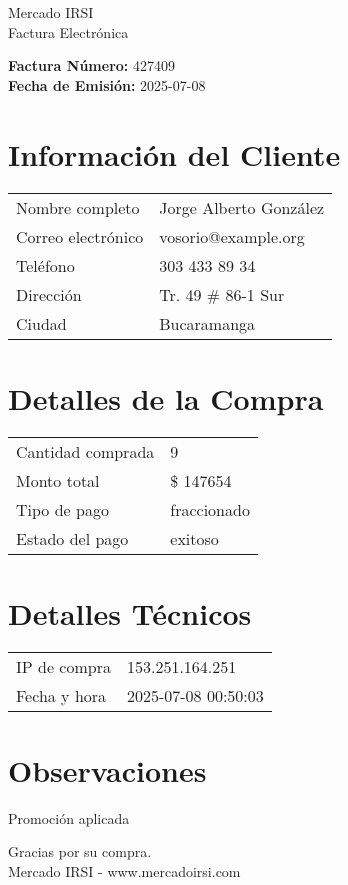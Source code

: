 \documentclass[12pt]{article}
\begin{document}
\begin{center}
    \Huge Mercado IRSI \\
    \Large Factura Electrónica
\end{center}

\vspace{0.5cm}

\noindent \textbf{Factura Número:} 427409 \\
\textbf{Fecha de Emisión:} 2025-07-08

\vspace{0.5cm}

\section*{Información del Cliente}
\begin{longtable}{ll}
Nombre completo & Jorge Alberto González \\
Correo electrónico & vosorio@example.org \\
Teléfono & 303 433 89 34 \\
Dirección & Tr. 49 # 86-1 Sur \\
Ciudad & Bucaramanga \\
\end{longtable}

\vspace{0.5cm}

\section*{Detalles de la Compra}
\begin{longtable}{ll}
Cantidad comprada & 9 \\
Monto total & \$ 147654 \\
Tipo de pago & fraccionado \\
Estado del pago & exitoso \\
\end{longtable}

\vspace{0.5cm}

\section*{Detalles Técnicos}
\begin{longtable}{ll}
IP de compra & 153.251.164.251 \\
Fecha y hora & 2025-07-08 00:50:03 \\
\end{longtable}

\vspace{0.5cm}

\section*{Observaciones}
Promoción aplicada

\vspace{0.5cm}

\begin{center}
    Gracias por su compra. \\
    Mercado IRSI - www.mercadoirsi.com
\end{center}
\end{document}
